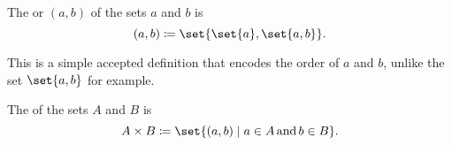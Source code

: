 \begin{definition}\label{def:binary_cartesian_product}
  The  or  \( (a, b) \) of the sets \( a \) and \( b \) is
  \begin{equation*}
    (a, b) \coloneqq \set{ \set{ a }, \set{ a, b } }.
  \end{equation*}

  This is a simple accepted definition that encodes the order of \( a \) and \( b \), unlike the set \( \set{ a, b } \) for example.

  The  of the sets \( A \) and \( B \) is
  \begin{equation*}
    A \times B \coloneqq \set{ (a, b) \given a \in A \T{and} b \in B }.
  \end{equation*}
\end{definition}
